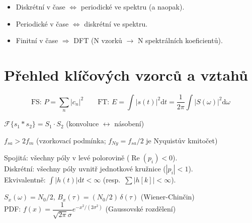 \documentclass[12pt,a4paper]{article}
\newcommand{\FT}{\mathcal{F}}
\newcommand{\dd}{\mathrm{d}}
\begin{document}
\begin{noteBox}
\begin{itemize}
  \item Diskrétní v čase $\Leftrightarrow$ periodické ve spektru (a naopak).
  \item Periodické v čase $\Leftrightarrow$ diskrétní ve spektru.
  \item Finitní v čase $\Rightarrow$ DFT (N vzorků $\to$ N spektrálních koeficientů).
\end{itemize}
\end{noteBox}

\section*{Přehled klíčových vzorců a vztahů}

\begin{matBox}
\[
  \text{FS: } P = \sum_{n}|c_n|^2
  \qquad
  \text{FT: } E = \int|s(t)|^2\dd t = \frac{1}{2\pi}\int|S(\omega)|^2\dd\omega
\]
\end{matBox}

\begin{matBox}
$\FT\{s_1 * s_2\} = S_1 \cdot S_2$ \hfill (konvoluce $\leftrightarrow$ násobení)
\end{matBox}

\begin{matBox}[Shannon]
$f_{sa} > 2f_m$ \hfill (vzorkovací podmínka; $f_{Ny}=f_{sa}/2$ je Nyquistův kmitočet)
\end{matBox}

\begin{matBox}
Spojitá: všechny póly v levé polorovině ($\operatorname{Re}(p_i)<0$).\\
Diskrétní: všechny póly uvnitř jednotkové kružnice ($|p_i|<1$).\\
Ekvivalentně: $\int|h(t)|\dd t < \infty$ (resp.\ $\sum|h[k]|<\infty$).
\end{matBox}

\begin{matBox}
$S_x(\omega) = N_0/2$, \quad $B_x(\tau) = (N_0/2)\,\delta(\tau)$ \hfill (Wiener-Chinčin)\\
PDF: $f(x) = \dfrac{1}{\sqrt{2\pi}\sigma}e^{-x^2/(2\sigma^2)}$ \hfill (Gaussovské rozdělení)
\end{matBox}
\end{document}
